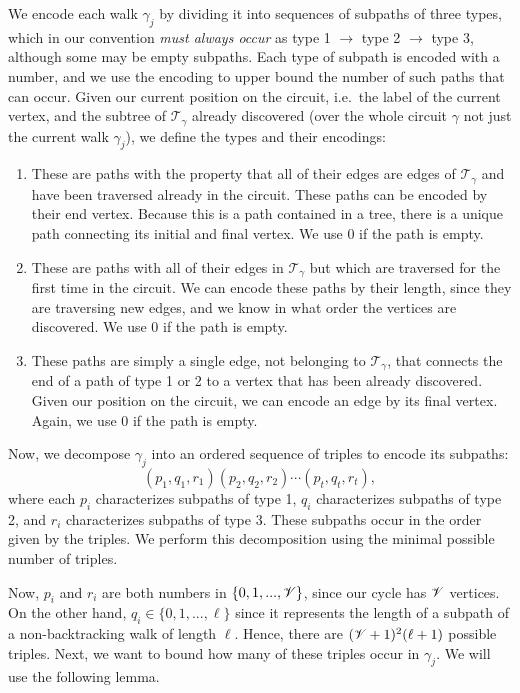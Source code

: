 We encode each walk $\gamma_j$
by dividing it into sequences of subpaths of three types,
which in our convention 
{\it must always occur} as type 1 $\to$ type 2 $\to$ type 3,
although some may be empty subpaths.
Each type of subpath is encoded with a number, 
and we use the encoding to upper bound the number of such paths that can occur.
Given our current
position on the circuit, i.e.\ the label of the current vertex, and
the subtree of $\mathcal{T}_{\gamma}$ already discovered 
(over the whole circuit $\gamma$
not just the current walk $\gamma_j$), 
we define the types and their encodings:
\begin{enumerate}[{Type} 1:]
\item These are paths with the property that all of their edges
are edges of $\mathcal{T}_{\gamma}$ and have been traversed already in
the circuit. 
These paths can be encoded by their end vertex.
Because this is a path contained in a tree,
there is a unique path connecting its initial and final vertex. 
We use 0 if the path is empty.
\item These are paths with all of their
edges in $\mathcal{T}_{\gamma}$ 
but which are traversed for the first time in the circuit. 
We can encode these paths by their length,
since they are traversing new edges, and we know in what order the
vertices are discovered. 
We use 0 if the path is empty.
\item These paths are simply a single edge, 
not belonging to $\mathcal{T}_\gamma$,
that connects the end of a path of type 1 or 2 
to a vertex that has been already discovered. 
Given our position on the circuit, 
we can encode an edge by its final vertex. 
Again, we use 0 if the path is empty.
\end{enumerate}
Now, we decompose $\gamma_j$ into an ordered sequence of triples
to encode its subpaths:
\[ 
(p_1,q_1,r_1) (p_2,q_2,r_2) \cdots (p_t,q_t,r_t),
\]
where each $p_i$ characterizes subpaths of type 1, $q_i$ characterizes
subpaths of type 2, and $r_i$ characterizes subpaths of type 3.
These subpaths occur in the order given by the triples.
We perform this decomposition using the minimal possible number of triples.

Now, $p_i$ and $r_i$ are both numbers in $\{0,1,...,\mathscr{V} \}$, since
our cycle has $\mathscr{V}$ vertices. On the other hand, $q_i \in \{ 0,1,...,\ell \}$
since it represents the length of a subpath of a non-backtracking
walk of length $\ell$. 
Hence, there are  $(\mathscr{V} + 1)^2 (\ell+1)$ possible triples. 
Next, we want to bound how many of these triples occur in $\gamma_j$. 
We will use the following lemma.

